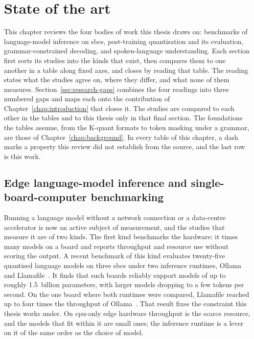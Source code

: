 \chapter{State of the art}
\label{chap:state-of-the-art}

This chapter reviews the four bodies of work this thesis draws on: benchmarks of language-model
inference on \glspl{sbc}, post-training quantisation and its evaluation, grammar-constrained
decoding, and spoken-language understanding. Each section first sorts its studies into the kinds
that exist, then compares them to one another in a table along fixed axes, and closes by reading
that table. The reading states what the studies agree on, where they differ, and what none of
them measures.
Section~\ref{sec:research-gaps} combines the four readings into three numbered gaps and maps each
onto the contribution of Chapter~\ref{chap:introduction} that closes it. The studies are compared
to each other in the tables and to this thesis only in that final section. The foundations the
tables assume, from the K-quant formats to token masking under a grammar, are those of
Chapter~\ref{chap:background}. In every table of this chapter, a dash marks a property this
review did not establish from the source, and the last row is this work.

\section{Edge language-model inference and single-board-computer benchmarking}
\label{sec:soa-edge}
Running a language model without a network connection or a data-centre accelerator is now an
active subject of measurement, and the studies that measure it are of two kinds. The first kind
benchmarks the hardware: it times many models on a board and reports throughput and resource use
without scoring the output. A recent benchmark of this kind evaluates twenty-five
quantised language models on three \glspl{sbc} under two inference runtimes, Ollama and
Llamafile~\cite{sbc2025}. It finds that such boards reliably support models of up to roughly
1.5~billion parameters, with larger models dropping to a few tokens per second. On the
one board where both runtimes were compared, Llamafile reached up to four times the throughput of
Ollama~\cite{sbc2025}. That result fixes the constraint this thesis works under. On
\gls{cpu}-only edge hardware throughput is the scarce resource, and the models that fit within it
are small ones; the inference runtime is a lever on it of the same order as the choice of model.

